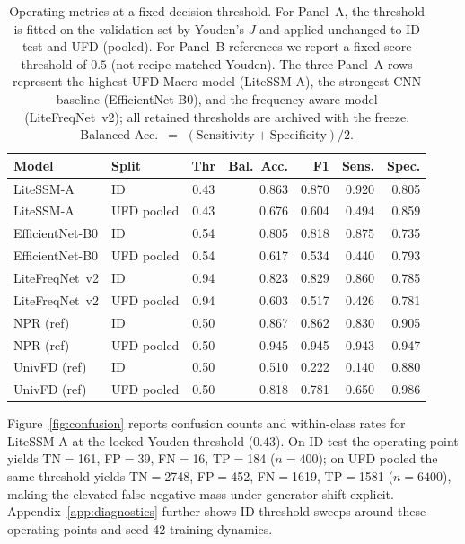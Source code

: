 \begin{table}[H]
\caption{Operating metrics at a fixed decision threshold.
For Panel~A, the threshold is fitted on the validation set by Youden's $J$ and applied unchanged to ID test and UFD (pooled).
For Panel~B references we report a fixed score threshold of $0.5$ (not recipe-matched Youden).
The three Panel~A rows represent the highest-UFD-Macro model (LiteSSM-A), the strongest CNN baseline (EfficientNet-B0), and the frequency-aware model (LiteFreqNet~v2); all retained thresholds are archived with the freeze.
Balanced Acc.\ $=$ $(\mathrm{Sensitivity}+\mathrm{Specificity})/2$.\label{tab:operate}}
\scriptsize
\setlength{\tabcolsep}{3.2pt}
\begin{tabularx}{\textwidth}{@{}P{2.15cm}l c *{4}{R}@{}}
\toprule
\textbf{Model} & \textbf{Split} & \textbf{Thr} & \textbf{Bal.\ Acc.} & \textbf{F1} & \textbf{Sens.} & \textbf{Spec.} \\
\midrule
LiteSSM-A & ID & 0.43 & 0.863 & 0.870 & 0.920 & 0.805 \\
LiteSSM-A & UFD pooled & 0.43 & 0.676 & 0.604 & 0.494 & 0.859 \\
EfficientNet-B0 & ID & 0.54 & 0.805 & 0.818 & 0.875 & 0.735 \\
EfficientNet-B0 & UFD pooled & 0.54 & 0.617 & 0.534 & 0.440 & 0.793 \\
LiteFreqNet~v2 & ID & 0.94 & 0.823 & 0.829 & 0.860 & 0.785 \\
LiteFreqNet~v2 & UFD pooled & 0.94 & 0.603 & 0.517 & 0.426 & 0.781 \\
NPR (ref) & ID & 0.50 & 0.867 & 0.862 & 0.830 & 0.905 \\
NPR (ref) & UFD pooled & 0.50 & 0.945 & 0.945 & 0.943 & 0.947 \\
UnivFD (ref) & ID & 0.50 & 0.510 & 0.222 & 0.140 & 0.880 \\
UnivFD (ref) & UFD pooled & 0.50 & 0.818 & 0.781 & 0.650 & 0.986 \\
\bottomrule
\end{tabularx}
\end{table}

Figure~\ref{fig:confusion} reports confusion counts and within-class rates for LiteSSM-A at the locked Youden threshold ($0.43$).
On ID test the operating point yields TN$=$161, FP$=$39, FN$=$16, TP$=$184 ($n{=}400$); on UFD pooled the same threshold yields TN$=$2748, FP$=$452, FN$=$1619, TP$=$1581 ($n{=}6400$), making the elevated false-negative mass under generator shift explicit.
Appendix~\ref{app:diagnostics} further shows ID threshold sweeps around these operating points and seed-42 training dynamics.

